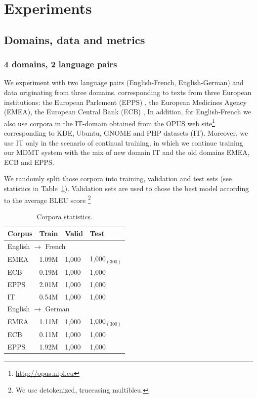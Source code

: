 \section{Experiments \label{sec:experiments-chap5}}
\subsection{Domains, data and metrics \label{ssec:data-chap5}}
\subsubsection{4 domains, 2 language pairs}
We experiment with two language pairs (English-French, English-German) and data originating from three domains, corresponding to texts from three European institutions: 
the European Parlement (EPPS) \citep{Koehn05europarl}, 
the European Medicines Agency (EMEA), 
the European Central Bank (ECB) \citep{Tiedemann09news},
In addition, for English-French we also use corpora in the IT-domain obtained from the OPUS web site\footnote{\url{http://opus.nlpl.eu}} corresponding to KDE, Ubuntu, GNOME and PHP datasets (IT). Moreover, we use IT only in the scenario of continual training, in which we continue training our MDMT system with the mix of new domain IT and the old domains EMEA, ECB and EPPS.

We randomly split those corpora into training, validation and test sets (see statistics in Table~\ref{tab:Corpora-chap5}).
Validation sets are used to chose the best model according to the average BLEU score \citep{Papineni02bleu}\footnote{We use detokenized, truecasing multibleu.}

\begin{table}[h]
  \centering
  \begin{tabular}{ |llll|} %
    \hline
    Corpus & Train & Valid & Test \\ 
    \hline
    \multicolumn{4}{l}{English $\rightarrow$ French }\\
    \hline
    EMEA  & 1.09M & 1,000 & 1,000$_{(300)}$\\
    ECB    & 0.19M & 1,000 & 1,000     \\
    EPPS   & 2.01M  & 1,000 & 1,000  \\
    IT         & 0.54M  & 1,000 & 1,000 \\  
    \hline
    \multicolumn{4}{l}{English $\rightarrow$ German}\\
    \hline
    EMEA  & 1.11M & 1,000 & 1,000$_{(300)}$ \\
    ECB     &  0.11M & 1,000 & 1,000  \\
    EPPS   & 1.92M & 1,000 & 1,000 \\ 
    \hline
\end{tabular}
\caption{Corpora statistics.}
\label{tab:Corpora-chap5}
\end{table}

